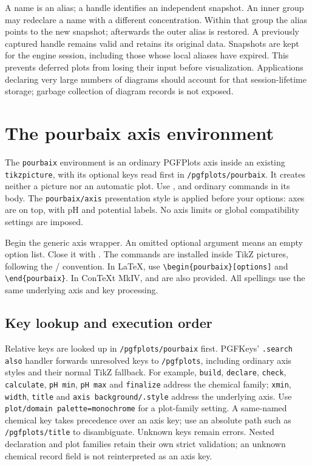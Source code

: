 \documentclass[a4paper,11pt]{ltxdoc}
\begin{document}
A name is an alias; a handle identifies an independent snapshot. An inner group
may redeclare a name with a different concentration. Within that group the alias
points to the new snapshot; afterwards the outer alias is restored. A previously
captured handle remains valid and retains its original data. Snapshots are kept
for the engine session, including those whose local aliases have expired. This
prevents deferred plots from losing their input before visualization.
Applications declaring very large numbers of diagrams should account for that
session-lifetime storage; garbage collection of diagram records is not exposed.

\section{The pourbaix axis environment}
\label{sec:pourbaix-environment}
The \texttt{pourbaix} environment is an ordinary PGFPlots axis inside an existing
\texttt{tikzpicture}, with its optional keys read first in
\texttt{/pgfplots/pourbaix}. It creates neither a picture nor an automatic plot.
Use ,  and ordinary  commands in
its body. The \texttt{pourbaix/axis} presentation style is applied before your
options: axes are on top, with pH and potential labels. No axis limits or global
compatibility settings are imposed.

\begin{command}{\pourbaix{}}
Begin the generic axis wrapper. An omitted optional argument means an empty
option list. Close it with . The commands are installed inside
TikZ pictures, following the / convention.
In LaTeX, use \verb|\begin{pourbaix}[options]| and \verb|\end{pourbaix}|.
In ConTeXt MkIV,  and  are also
provided. All spellings use the same underlying axis and key processing.
\end{command}

\subsection{Key lookup and execution order}
Relative keys are looked up in \texttt{/pgfplots/pourbaix} first. PGFKeys'
\texttt{.search also} handler forwards unresolved keys to \texttt{/pgfplots},
including ordinary axis styles and their normal TikZ fallback. For example,
\texttt{build}, \texttt{declare}, \texttt{check}, \texttt{calculate}, \texttt{pH min},
\texttt{pH max} and \texttt{finalize} address the chemical family;
\texttt{xmin}, \texttt{width}, \texttt{title} and \texttt{axis background/.style}
address the underlying axis. Use \texttt{plot/domain palette=monochrome} for a
plot-family setting. A same-named chemical key takes precedence over an axis key;
use an absolute path such as \texttt{/pgfplots/title} to disambiguate. Unknown
keys remain errors. Nested declaration and plot families retain their own strict
validation; an unknown chemical record field is not reinterpreted as an axis key.
\end{document}
